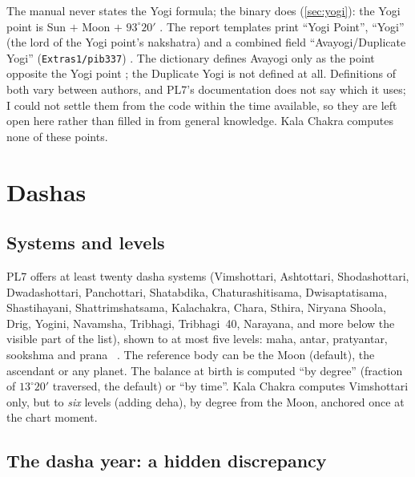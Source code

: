 The manual never states the Yogi formula; the binary does (\autoref{sec:yogi}): the Yogi
point is Sun $+$ Moon $+$ $93^\circ 20'$ \tagBIN. The report templates print ``Yogi
Point'', ``Yogi'' (the lord of the Yogi point's nakshatra) and a combined field
``Avayogi/Duplicate Yogi'' (\texttt{Extras1/pib337}) \tagDOC. The dictionary defines
Avayogi only as the point opposite the Yogi point \parencite[p.~208]{geovision2006pl7};
the Duplicate Yogi is not defined at all. Definitions of both vary between authors, and PL7's documentation does not say which it
uses; I could not settle them from the code within the time available, so they are left
open here rather than filled in from general knowledge. Kala Chakra computes
none of these points.

\section{Dashas}
\label{sec:dashas}

\subsection{Systems and levels}

PL7 offers at least twenty dasha systems (Vimshottari, Ashtottari, Shodashottari,
Dwadashottari, Panchottari, Shatabdika, Chaturashitisama, Dwisaptatisama, Shastihayani,
Shattrimshatsama, Kalachakra, Chara, Sthira, Niryana Shoola, Drig, Yogini, Navamsha,
Tribhagi, Tribhagi~40, Narayana, and more below the visible part of the list), shown to at
most five levels: maha, antar, pratyantar, sookshma and prana \tagDOC\
\parencite[pp.~42--44]{geovision2006pl7}. The reference body can be the Moon (default), the
ascendant or any planet. The balance at birth is computed ``by degree'' (fraction of
$13^\circ 20'$ traversed, the default) or ``by time''. Kala Chakra computes Vimshottari only,
but to \emph{six} levels (adding deha), by degree from the Moon, anchored once at the chart
moment.

\subsection{The dasha year: a hidden discrepancy}

